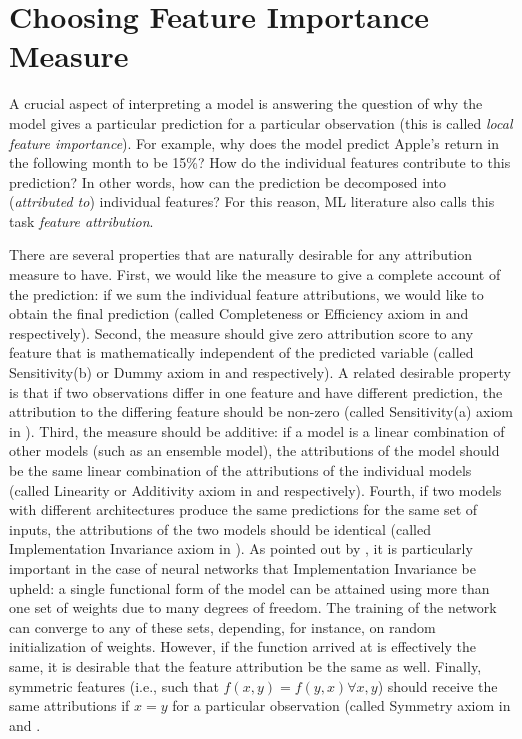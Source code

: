 				
		\section{Choosing Feature Importance Measure}
			\label{chap:local_measures}
			A crucial aspect of interpreting a model is answering the question of why the model gives a particular prediction for a particular observation (this is called \textit{local feature importance}). For example, why does the model predict Apple's return in the following month to be 15\%? How do the individual features contribute to this prediction? In other words, how can the prediction be decomposed into (\textit{attributed to}) individual features? For this reason, ML literature also calls this task \textit{feature attribution}.  
			
			There are several properties that are naturally desirable for any attribution measure to have. First, we would like the measure to give a complete account of the prediction: if we sum the individual feature attributions, we would like to obtain the final prediction (called Completeness or Efficiency axiom in \cite{sundararajan2017axiomatic} and \cite{molnar2020interpretable} respectively). Second, the measure should give zero attribution score to any feature that is mathematically independent of the predicted variable (called Sensitivity(b) or Dummy axiom in \cite{sundararajan2017axiomatic} and \cite{molnar2020interpretable} respectively). A related desirable property is that if two observations differ in one feature and have different prediction, the attribution to the differing feature should be non-zero (called Sensitivity(a) axiom in \cite{sundararajan2017axiomatic}). Third, the measure should be additive: if a model is a linear combination of other models (such as an ensemble model), the attributions of the model should be the same linear combination of the attributions of the individual models (called Linearity or Additivity axiom in \cite{sundararajan2017axiomatic} and \cite{molnar2020interpretable} respectively). Fourth, if two models with different architectures produce the same predictions for the same set of inputs, the attributions of the two models should be identical (called Implementation Invariance axiom in \cite{sundararajan2017axiomatic}). As pointed out by \cite{sundararajan2017axiomatic}, it is particularly important in the case of neural networks that Implementation Invariance be upheld: a single functional form of the model can be attained using more than one set of weights due to many degrees of freedom. The training of the network can converge to any of these sets, depending, for instance, on random initialization of weights. However, if the function arrived at is effectively the same, it is desirable that the feature attribution be the same as well. Finally, symmetric features (i.e., such that $f(x,y) = f(y,x) \forall x, y$) should receive the same attributions if $x=y$ for a particular observation (called Symmetry axiom in \cite{shrikumar2017learning} and  \cite{molnar2020interpretable}. 
			
